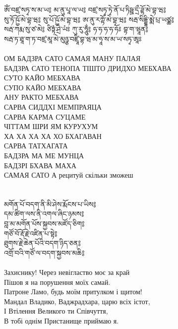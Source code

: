 \ru
\newpage
\ti
ཨོཾ་བཛྲ་སཏྭ་ས་མ་ཡ༔ མ་ནུ་པཱ་ལ་ཡ༔ བཛྲ་སཏྭ་ཏྭེ་ནོ་པ་ཏིཥྛ་དྲྀ་ཌྷོ་མེ་བྷ་ཝ༔ \\
སུ་ཏོ་ཥྱོ་མེ་བྷ་ཝ༔ སུ་པོ་ཥྱོ་མེ་བྷ་ཝ༔ ཨ་ནུ་རཀྟོ་མེ་བྷ་ཝ༔ སརྦ་སིདྡྷི་མྨེ་པྲ་ཡཙྪ༔ \\
སརྦ་ཀརྨ་སུ་ཙ་མེ༔ ཙིཏྟཾ་ཤྲེ་ཡཾཿ ཀུ་རུ་ཧཱུྂ༔ ཧ་ཧ་ཧ་ཧ་ཧོཿ བྷ་ག་ཝཱན༔ \\
སརྦ་ཏ་ཐཱ་ག་ཏ་བཛྲ་མཱ་མེ་མུཉྩ་བཛྲཱི་བྷ་ཝ་མ་ཧཱ་ས་མ་ཡ་སཏྭ་ཨཱཿ\\
\\
\ru
ОМ БАДЗРА САТО САМАЯ МАНУ ПАЛАЯ\\
БАДЗРА САТО ТЕНОПА ТІШТО ДРИДХО МЕБХАВА\\
СУТО КАЙО МЕБХАВА\\
СУПО КАЙО МЕБХАВА\\
АНУ РАКТО МЕБХАВА\\
САРВА СИДДХІ МЕМПРАЯЦА\\
САРВА КАРМА СУЦАМЕ\\
ЧІТТАМ ШРИ ЯМ КУРУХУМ\\
ХА ХА ХА ХА ХО БХАГАВАН\\
САРВА ТАТХАГАТА\\
БАДЗРА МА МЕ МУНЦА\\
БАДЗРІ БХАВА МАХА\\
САМАЯ САТО А \hspace{2cm} \scriptsize рецитуй скільки зможеш \normalsize \\
\\
\\
\ti
མགོན་པོ་བདག་ནི་མི་ཤེས་རྨོངས་པ་ཡིས༔\\
དམ་ཚིག་ལས་ནི་འགལ་ཞིང་ཉམས༔ \\
བླ་མ་མགོན་པོས་སྐྱབས་མཛོད་ཅིག༔ \\
གཙོ་བོ་རྡོ་རྗེ་འཛིན་པ་སྟེ༔ \\
ཐུགས་རྗེ་ཆེན་པོའི་བདག་ཉིད་ཅན༔ \\
འགྲོ་བའི་གཙོ་ལ་བདག་སྐྱབས་མཆི༔\\
\\
\ru
Захиснику! Через невігластво моє за край\\
Пішов я на порушення моїх самай.\\
Патроне Ламо, будь моїм притулком і щитом!\\
Мандал Владико, Ваджрадхара, царю всіх істот,\\
І Втілення Великого ти Співчуття,\\
В тобі однім Пристанище приймаю я.\\

